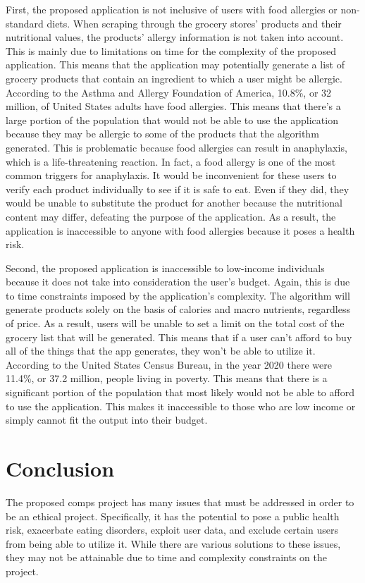 \documentclass[10pt,twocolumn]{article}
\begin{document}
First, the proposed application is not inclusive of users with food allergies or non-standard diets. When scraping through the grocery stores’ products and their nutritional values, the products’ allergy information is not taken into account. This is mainly due to limitations on time for the complexity of the proposed application. This means that the application may potentially generate a list of grocery products that contain an ingredient to which a user might be allergic. According to the Asthma and Allergy Foundation of America, 10.8\%, or 32 million, of United States adults have food allergies.\cite{AAFA_2021} This means that there’s a large portion of the population that would not be able to use the application because they may be allergic to some of the products that the algorithm generated. This is problematic because food allergies can result in anaphylaxis, which is a life-threatening reaction. In fact, a food allergy is one of the most common triggers for anaphylaxis.\cite{AAFA_2021} It would be inconvenient for these users to verify each product individually to see if it is safe to eat. Even if they did, they would be unable to substitute the product for another because the nutritional content may differ, defeating the purpose of the application. As a result, the application is inaccessible to anyone with food allergies because it poses a health risk. 

Second, the proposed application is inaccessible to low-income individuals because it does not take into consideration the user’s budget. Again, this is due to time constraints imposed by the application's complexity. The algorithm will generate products solely on the basis of calories and macro nutrients, regardless of price. As a result, users will be unable to set a limit on the total cost of the grocery list that will be generated. This means that if a user can't afford to buy all of the things that the app generates, they won't be able to utilize it. According to the United States Census Bureau, in the year 2020 there were 11.4\%, or 37.2 million, people living in poverty.\cite{bureau_2022} This means that there is a significant portion of the population that most likely would not be able to afford to use the application. This makes it inaccessible to those who are low income or simply cannot fit the output into their budget. 

\section{Conclusion}
The proposed comps project has many issues that must be addressed in order to be an ethical project. Specifically, it has the potential to pose a public health risk, exacerbate eating disorders, exploit user data, and exclude certain users from being able to utilize it. While there are various solutions to these issues, they may not be attainable due to time and complexity constraints on the project. 

\printbibliography
\end{document}
